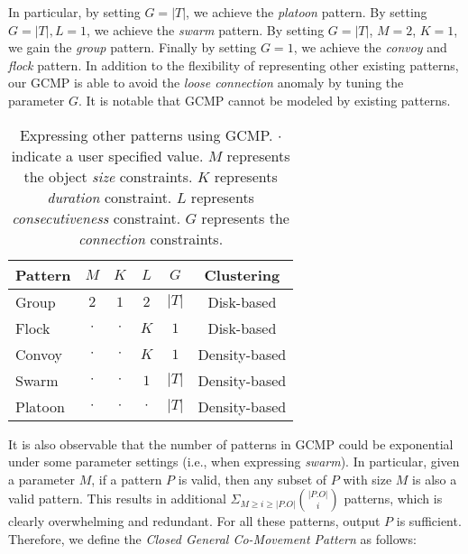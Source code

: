 In particular, by setting $G=|T|$, we achieve the \emph{platoon} pattern. By setting $G=|T|,L=1$, we achieve the \emph{swarm} pattern. By setting $G=|T|$, $M=2$, $K=1$, we gain the \emph{group} pattern. Finally by setting $G=1$, we achieve the \emph{convoy} and \emph{flock} pattern. 
In addition to the flexibility of representing other existing patterns, our GCMP is able to avoid the \emph{loose connection} anomaly by tuning the parameter $G$. 
%
It is notable that GCMP cannot be modeled by existing patterns. %

\begin{table}
\centering
\begin{tabular}{|l|c|c|c|c|c|}
\hline 
Pattern & $M$ & $K$ & $L$ & $G$ & Clustering\\ 
\hline
Group & $2$ & $1$ & $2$ & $|T|$ & Disk-based\\
\hline
Flock & $\cdot$ & $\cdot$ & $K$ & $1$ & Disk-based \\
\hline 
Convoy & $\cdot$ & $\cdot$ & $K$ & $1$ & Density-based\\ 
\hline 
Swarm & $\cdot$ & $\cdot$ & $1$ & $|T|$ & Density-based \\ 
\hline 
Platoon & $\cdot$ & $\cdot$ & $\cdot$ & $|T|$ & Density-based\\ 
\hline 
\end{tabular} 
\caption{Expressing other patterns using GCMP. $\cdot$ indicate a user specified value. $M$ represents the 
object \emph{size} constraints. $K$ represents \emph{duration} constraint. $L$ represents \emph{consecutiveness} constraint. $G$ represents the \emph{connection} constraints.}
\label{tbl:patterns}
\end{table}
 
It is also observable that the number of patterns in GCMP could be exponential under some parameter settings (i.e., 
when expressing \emph{swarm}). In particular, given a parameter $M$, if a pattern $P$ is valid, then any subset of $P$ with 
size $M$ is also a valid pattern. This results in additional $\Sigma_{M\geq i \geq |P.O|} {|P.O| \choose i}$ patterns,
which is clearly overwhelming and redundant. For all these patterns, output $P$ is sufficient. Therefore, we define the \emph{Closed General Co-Movement Pattern} as follows:
%

